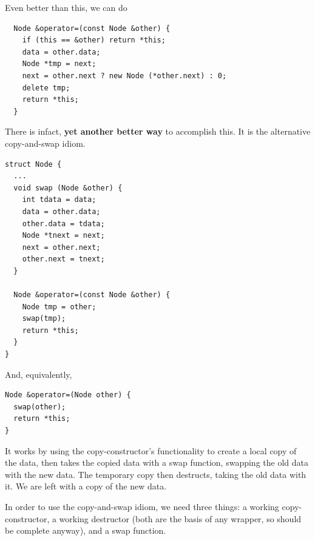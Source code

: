 \documentclass[english, 11pt]{article}
\begin{document}
Even better than this, we can do
\begin{lstlisting}
  Node &operator=(const Node &other) {
    if (this == &other) return *this;
    data = other.data;
    Node *tmp = next;
    next = other.next ? new Node (*other.next) : 0;
    delete tmp;
    return *this;
  }
\end{lstlisting}
There is infact, \textbf{yet another better way} to accomplish this. It is the alternative copy-and-swap idiom.
\begin{lstlisting}
struct Node {
  ...
  void swap (Node &other) {
    int tdata = data;
    data = other.data;
    other.data = tdata;
    Node *tnext = next;
    next = other.next;
    other.next = tnext;
  }

  Node &operator=(const Node &other) {
    Node tmp = other;
    swap(tmp);
    return *this;
  }
}
\end{lstlisting}
And, equivalently,
\begin{lstlisting}
Node &operator=(Node other) {
  swap(other);
  return *this;
}
\end{lstlisting}
 It works by using the copy-constructor's functionality to create a local copy of the data, then takes the copied data with a swap function, swapping the old data with the new data. The temporary copy then destructs, taking the old data with it. We are left with a copy of the new data.

In order to use the copy-and-swap idiom, we need three things: a working copy-constructor, a working destructor (both are the basis of any wrapper, so should be complete anyway), and a swap function. \\
\end{document}
